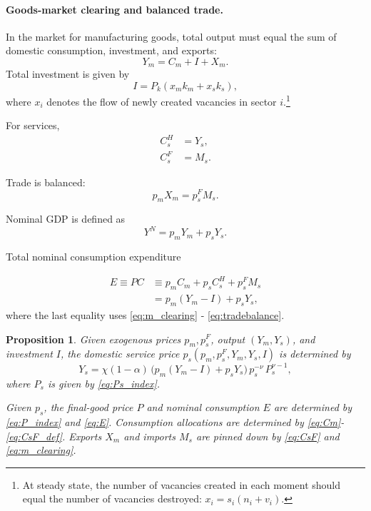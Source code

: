 \documentclass[12pt]{article} %
\newtheorem{proposition}{Proposition}
\theoremstyle{definition}
\begin{document}
\paragraph{Goods-market clearing and balanced trade.}  In the market for manufacturing goods, total output must equal  the sum of domestic consumption, investment, and exports: 
\begin{equation}
    Y_m = C_m + I + X_m. \label{eq:m_clearing}
\end{equation}
Total investment is given by
\begin{equation}
    I = P_k(x_mk_m+x_sk_s),  \label{eq:capital_cost}
\end{equation}
where $x_i$ denotes the flow of newly created vacancies in sector $i$.\footnote{At steady state, the number of vacancies created in each moment should equal the number of vacancies destroyed: $x_i = s_i(n_i+v_i)$.}

For services, 
\begin{align}
    C_s^H &= Y_s,  \label{eq:CsH}\\
    C_s^F & = M_s.  \label{eq:CsF}
\end{align}

Trade is balanced:
\begin{equation}
    p_m X_m = p^F_sM_s.   \label{eq:tradebalance}
\end{equation}


Nominal GDP is defined as 
\begin{equation}
    Y^N = p_mY_m + p_sY_s.
\end{equation}


Total nominal consumption expenditure

\begin{align}
    E \equiv PC &\equiv p_m C_m + p_sC^H_s + p_s^FM_s \\
   &  = p_m(Y_m-I) + p_sY_s,   \label{eq:E}
\end{align}
where the last equality  uses \eqref{eq:m_clearing} - \eqref{eq:tradebalance}.


\begin{proposition}\label{prop:tradeblock}
    Given exogenous prices $p_m, p_s^F $, output $(Y_m, Y_s)$, and investment $I$, the  domestic service price $p_s(p_m, p_s^F, Y_m, Y_s, I)$ is determined by
\begin{equation}
Y_s
=
\chi (1-\alpha)\,\big(p_m (Y_m-I) + p_s Y_s\big)\, p_s^{-\nu}\, P_s^{\nu-1},
\label{eq:ps_solution}
\end{equation}
where $P_s$ is given by \eqref{eq:Ps_index}.  

Given $p_s$, the final-good price $P$ and  nominal consumption $E$ are determined by \eqref{eq:P_index} and \eqref{eq:E}. Consumption allocations  are determined by \eqref{eq:Cm}-\eqref{eq:CsF_def}. Exports $X_m$ and imports $M_s$ are pinned down by \eqref{eq:CsF} and \eqref{eq:m_clearing}.
\end{proposition}
\end{document}
